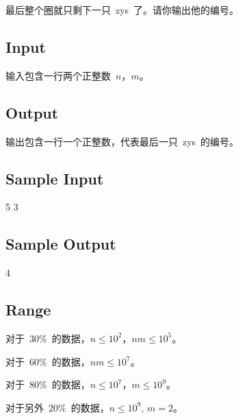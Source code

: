 \documentclass[12pt, hyperref, UTF8]{article}
\begin{document}
	最后整个圈就只剩下一只~zys~了。请你输出他的编号。

	\subsection{Input}
	输入包含一行两个正整数~$n$，$m$。

	\subsection{Output}
	输出包含一行一个正整数，代表最后一只~zys~的编号。

	\subsection{Sample Input}
	5 3

	\subsection{Sample Output}
	4

	\subsection{Range}
	对于~$30\%$~的数据，$n \le 10^2$，$nm \le 10^5$。

	对于~$60\%$~的数据，$nm \le 10^7$。
	
	对于~$80\%$~的数据，$n \le 10^7$，$m \le 10^9$。
	
	对于另外~$20\%$~的数据，$n \le 10^9$, $m = 2$。
\end{document}

